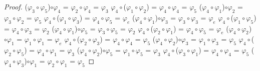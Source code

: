 \documentclass[10pt,a4paper,oneside]{article}
\begin{document}
\begin{proof}
				($\varphi_{3}\circ\varphi_{5}$)$\circ\varphi_{4}$ = $\varphi_{2}\circ\varphi_{4}$ = $\varphi_{3}$
				\newline
				\newline
				$\varphi_{4}\circ$($\varphi_{1}\circ\varphi_{2}$) = $\varphi_{4}\circ\varphi_{4}$ = $\varphi_{5}$
				\newline
				($\varphi_{4}\circ\varphi_{1}$)$\circ\varphi_{2}$ = $\varphi_{3}\circ\varphi_{2}$ = $\varphi_{5}$
				\newline
				\newline
				$\varphi_{4}\circ$($\varphi_{1}\circ\varphi_{3}$) = $\varphi_{4}\circ\varphi_{5}$ = $\varphi_{e}$
				\newline
				($\varphi_{4}\circ\varphi_{1}$)$\circ\varphi_{3}$ = $\varphi_{3}\circ\varphi_{3}$ = $\varphi_{e}$
				\newline
				\newline
				$\varphi_{4}\circ$($\varphi_{1}\circ\varphi_{5}$) = $\varphi_{4}\circ\varphi_{3}$ = $\varphi_{2}$
				\newline
				($\varphi_{4}\circ\varphi_{1}$)$\circ\varphi_{5}$ = $\varphi_{3}\circ\varphi_{5}$ = $\varphi_{2}$
				\newline
				\newline
				$\varphi_{4}\circ$($\varphi_{2}\circ\varphi_{1}$) = $\varphi_{4}\circ\varphi_{5}$ = $\varphi_{e}$
				\newline
				($\varphi_{4}\circ\varphi_{2}$)$\circ\varphi_{1}$ = $\varphi_{1}\circ\varphi_{1}$ = $\varphi_{e}$
				\newline
				\newline
				$\varphi_{4}\circ$($\varphi_{2}\circ\varphi_{3}$) = $\varphi_{4}\circ\varphi_{4}$ = $\varphi_{5}$
				\newline
				($\varphi_{4}\circ\varphi_{2}$)$\circ\varphi_{3}$ = $\varphi_{1}\circ\varphi_{3}$ = $\varphi_{5}$
				\newline
				\newline
				$\varphi_{4}\circ$($\varphi_{2}\circ\varphi_{5}$) = $\varphi_{4}\circ\varphi_{1}$ = $\varphi_{3}$
				\newline
				($\varphi_{4}\circ\varphi_{2}$)$\circ\varphi_{5}$ = $\varphi_{1}\circ\varphi_{5}$ = $\varphi_{3}$
				\newline
				\newline
				$\varphi_{4}\circ$($\varphi_{3}\circ\varphi_{1}$) = $\varphi_{4}\circ\varphi_{4}$ = $\varphi_{5}$
				\newline
				($\varphi_{4}\circ\varphi_{3}$)$\circ\varphi_{1}$ = $\varphi_{2}\circ\varphi_{1}$ = $\varphi_{5}$

\end{proof}
\end{document}
